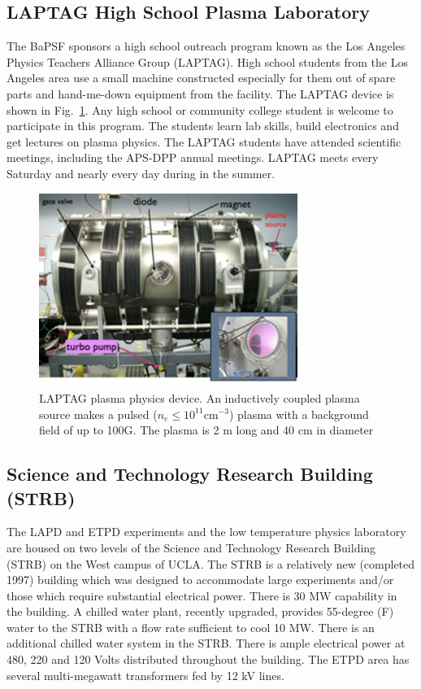 \documentclass[11pt]{article}
\begin{document}
\subsection{LAPTAG High School Plasma Laboratory}
The BaPSF sponsors a high school outreach program known as the Los Angeles Physics Teachers Alliance Group  (LAPTAG).  High school students from the Los Angeles area use a small machine constructed especially for them out of spare parts and hand-me-down equipment from the facility.  The LAPTAG device is shown in Fig.\ \ref{fig:laptag}.  Any high school or community college student is welcome to participate in this program.  The students learn lab skills, build electronics and get lectures on plasma physics. The LAPTAG students have attended scientific meetings, including the APS-DPP annual meetings.  LAPTAG meets every Saturday and nearly every day during in the summer.
\begin{figure}[htbp] %
   \centering
   \includegraphics[width=0.75\textwidth]{laptag.jpg} 
   \caption{LAPTAG plasma physics device.  An inductively coupled plasma source makes a pulsed ($n_{e}\le 10^{11}$cm$^{-3}$) plasma with a background field of up to 100G.  The plasma is 2 m long and 40 cm in diameter}
   \label{fig:laptag}
\end{figure}


\subsection{Science and Technology Research Building (STRB)}
The LAPD and ETPD experiments and the low temperature physics laboratory are housed on two levels of the Science and Technology Research Building (STRB) on the West campus of UCLA.  The STRB is a relatively new (completed 1997) building which was designed to accommodate large experiments and/or those which require substantial electrical power.  There is 30 MW capability in the building.  A chilled water plant, recently upgraded, provides 55-degree (F) water to the STRB with a flow rate sufficient to cool 10 MW.  There is an additional chilled water system in the STRB. There is ample electrical power at 480, 220 and 120 Volts distributed throughout the building.  The ETPD area has several multi-megawatt transformers fed by 12 kV lines.
\end{document}
